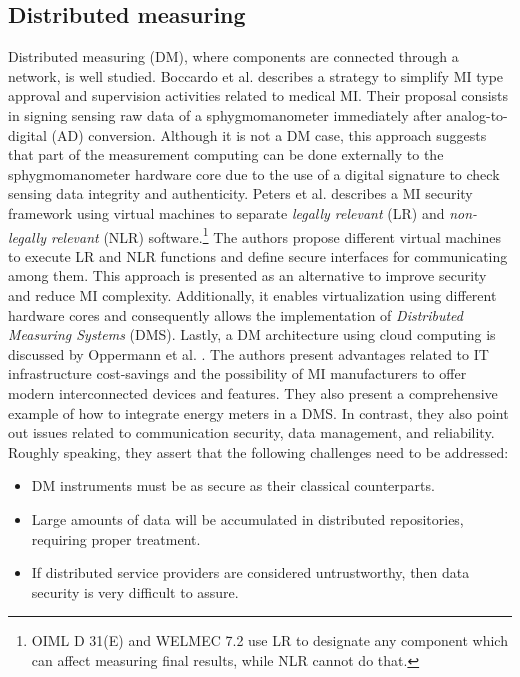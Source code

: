 \documentclass[journal]{IEEEtran}
\begin{document}
\subsection{Distributed measuring}
Distributed measuring (DM), where components are connected through a network, is well studied.
Boccardo et al. \cite{Boccardo2014} describes a strategy to simplify MI type approval and supervision activities related to medical MI.
Their proposal consists in signing sensing raw data of a sphygmomanometer immediately after analog-to-digital (AD) conversion.
Although it is not a DM case, this approach suggests that part of the measurement computing can be done externally to the sphygmomanometer hardware core due to the use of a digital signature to check sensing data integrity and authenticity.
Peters et al. \cite{Peters2015} describes a MI security framework using virtual machines to separate \emph{legally relevant} (LR) and \emph{non-legally relevant} (NLR) software.\footnote{OIML D 31(E) and WELMEC 7.2 use LR to designate any component which can affect measuring final results, while NLR cannot do that.} The authors propose different virtual machines to execute LR and NLR functions and define secure interfaces for communicating among them. This approach is presented as an alternative to improve security and reduce MI complexity. Additionally, it enables virtualization using different hardware cores and consequently allows the implementation of \emph{Distributed Measuring Systems} (DMS). Lastly, a DM architecture using cloud computing is discussed by Oppermann et al. \cite{Oppermann2018}. The authors present advantages related to IT infrastructure cost-savings and the possibility of MI manufacturers to offer modern interconnected devices and features.
They also present a comprehensive example of how to integrate energy meters in a DMS. 
In contrast, they also point out issues related to communication security, data management, and reliability. Roughly speaking, they assert that the following challenges need to be addressed:
\begin{itemize}
 \item DM instruments must be as secure as their classical counterparts.
 \item Large amounts of data will be accumulated in distributed repositories, requiring proper treatment.
 \item If distributed service providers are considered untrustworthy, then data security is very difficult to assure. 
\end{itemize}
\end{document}
